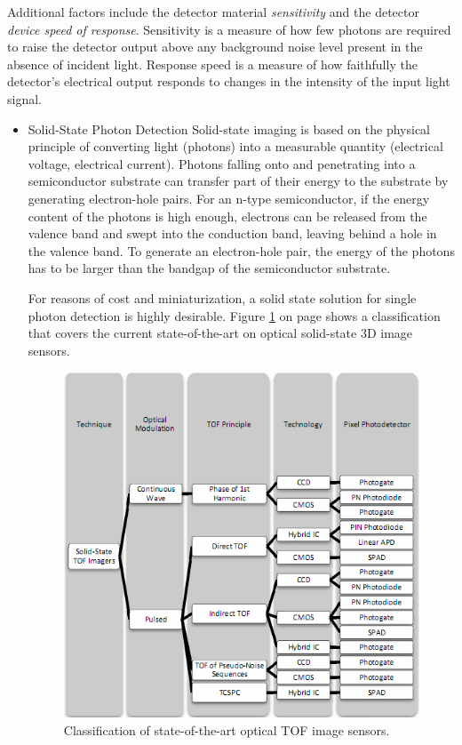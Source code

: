Additional factors include the detector material \textit{sensitivity} and the detector \textit{device speed of response}. Sensitivity is a measure of how few photons are required to raise the detector output above any background noise level present in the absence of incident light. Response speed is a measure of how faithfully the detector's electrical output responds to changes in the intensity of the input light signal.
\begin{itemize}
	\item Solid-State Photon Detection
Solid-state imaging is based on the physical principle of converting light (photons) into a measurable quantity (electrical voltage, electrical current). Photons falling onto and penetrating into a semiconductor substrate can transfer part of their energy to the substrate by generating electron-hole pairs. For an n-type semiconductor, if the energy content of the photons is high enough, electrons can be released from the valence band and swept into the conduction band, leaving behind a hole in the valence band. To generate an electron-hole pair, the energy of the photons has to be larger than the bandgap of the semiconductor substrate.\cite{photogrammetry}

For reasons of cost and miniaturization, a solid state solution for single photon detection is highly desirable. Figure \ref{fig:intro_receiver1} on page \pageref{fig:intro_receiver1} shows a classification that covers the current state-of-the-art on optical solid-state 3D image sensors. 

\begin{figure}[ht!]
\centering
\includegraphics[scale = 1]{chapters/img/intro_receiver1.png}
\caption{Classification of state-of-the-art optical \ac{TOF} image sensors.}
\label{fig:intro_receiver1}
\end{figure}


\end{itemize}
